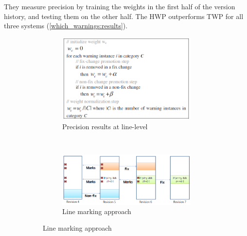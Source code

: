 \documentclass{article}
\begin{document}
 They measure precision by training the weights in the first half of the version history, and testing them on the other half. The HWP outperforms TWP for all three systems (\cref{which_warnings:results}).

 \begin{figure}[H]
     \begin{subfigure}{0.6\textwidth}
         \begin{subfigure}{.5\textwidth}
             \centering
             \includegraphics[scale=0.45]{./src/which_warnings_weights.png}
             \caption{Precision results at line-level}\label{which_warnings:weights}
         \end{subfigure}\\
         \begin{subfigure}{.5\textwidth}
         \centering
         \includegraphics[scale=0.35]{./src/which_warnings_marking.png}
         \caption{Line marking approach}\label{which_warnings:marking}
         \end{subfigure}
     \end{subfigure}%
     \begin{subfigure}{0.4\textwidth}
         \centering

\end{subfigure}
\end{figure}
\end{document}
